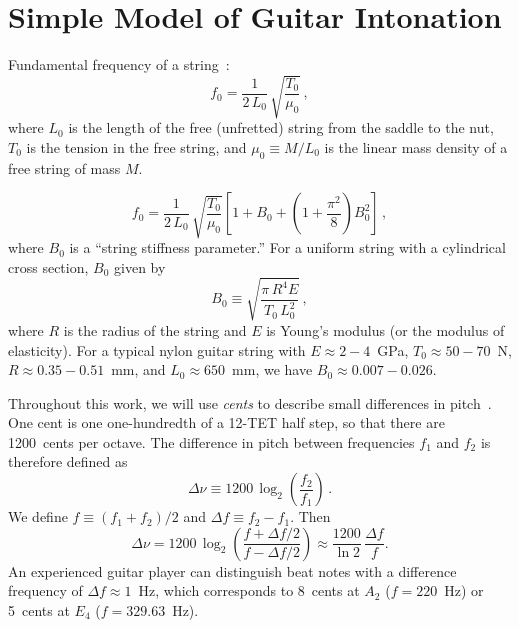 %
%
%

 \section{Simple Model of Guitar Intonation\label{sct:model}}

Fundamental frequency of a string~\cite{ref:morse1981vas,ref:morse1981vsa}:
 \begin{equation} \label{eqn:f_0_def}
f_0 = \frac{1}{2\, L_0}\, \sqrt{\frac{T_0}{\mu_0}}\, ,
 \end{equation}
where $L_0$ is the length of the free (unfretted) string from the saddle to the nut, $T_0$ is the tension in the free string, and $\mu_0 \equiv M / L_0$ is the linear mass density of a free string of mass $M$.

 \begin{equation} \label{eqn:f_0_stiff}
f_0 = \frac{1}{2\, L_0}\, \sqrt{\frac{T_0}{\mu_0}} \left[ 1 + B_0 + \left(1 + \frac{\pi^2}{8}\right) B_0^2 \right]\, ,
 \end{equation}
where $B_0$ is a ``string stiffness parameter.'' For a uniform string with a cylindrical cross section, $B_0$ given by~\cite{ref:morse1981vsb}
 \begin{equation} \label{eqn:b_def}
B_0 \equiv \sqrt{\frac{\pi\, R^4 E}{T_0\, L_0^2}}\, ,
 \end{equation}
where $R$ is the radius of the string and $E$ is Young's modulus (or the modulus of elasticity). For a typical nylon guitar string with $E \approx 2 - 4$~GPa, $T_0 \approx 50 - 70$~N, $R \approx 0.35 - 0.51$~mm, and $L_0 \approx 650$~mm, we have $B_0 \approx 0.007 - 0.026$.

Throughout this work, we will use \emph{cents} to describe small differences in pitch~\cite{ref:durfee2015pms}. One cent is one one-hundredth of a 12-TET half step, so that there are 1200~cents per octave. The difference in pitch between frequencies $f_1$ and $f_2$ is therefore defined as
 \begin{equation} \label{eqn:cents_def}
\Delta \nu \equiv 1200\, \log_2\left(\frac{f_2}{f_1}\right)\, .
 \end{equation}
We define $f \equiv (f_1 + f_2) / 2$ and $\Delta f \equiv f_2 - f_1$. Then
 \begin{equation} \label{eqn:cents_approx}
\Delta \nu = 1200\, \log_2\left(\frac{f + \Delta f / 2}{f - \Delta f /2}\right) \approx \frac{1200}{\ln 2}\, \frac{\Delta f}{f} .
 \end{equation}
An experienced guitar player can distinguish beat notes with a difference frequency of $\Delta f \approx 1$~Hz, which corresponds to 8~cents at $A_2$ ($f = 220$~Hz) or 5~cents at $E_4$ ($f = 329.63$~Hz).

